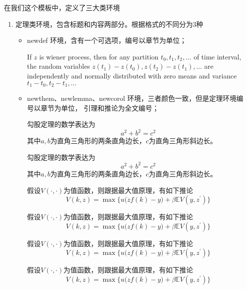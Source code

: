 \documentclass[cyan]{elegantnote}
\begin{document}
在我们这个模板中，定义了三大类环境
\begin{enumerate}
\item 定理类环境，包含标题和内容两部分。根据格式的不同分为3种
\begin{itemize}
\item {\color{main} newdef} 环境，含有一个可选项，编号以章节为单位；

\begin{newdef}
If $z$ is wiener process, then for any partition $t_0,t_1,t_2,\ldots$ of time interval, the 
random variables $z(t_1)-z(t_0),z(t_2)-z(t_1),\ldots$ are independently and normally distributed 
with zero means and variance $t_1-t_0,t_2-t_1,\ldots$
\end{newdef}

\item {\color{main}newthem、newlemma、newcorol} 环境，三者颜色一致，但是定理环境编号以章节为单位，
引理和推论为全文编号；

\begin{newthem}[勾股定理]
勾股定理的数学表达为
\[a^2+b^2=c^2\]
其中$a,b$为直角三角形的两条直角边长，$c$为直角三角形斜边长。
\end{newthem}

\begin{newthem}[勾股定理]
勾股定理的数学表达为
\[a^2+b^2=c^2\]
其中$a,b$为直角三角形的两条直角边长，$c$为直角三角形斜边长。
\end{newthem}

\begin{newlemma}
假设$V(\cdot,\cdot)$为值函数，则跟据最大值原理，有如下推论
\[
V(k,z)=\max\Big\{u\big(zf(k)-y\big)+\beta \mathbb{E}V(y,z^\prime)\Big\}
\]
\end{newlemma}

\begin{newlemma}
假设$V(\cdot,\cdot)$为值函数，则跟据最大值原理，有如下推论
\[
V(k,z)=\max\Big\{u\big(zf(k)-y\big)+\beta \mathbb{E}V(y,z^\prime)\Big\}
\]
\end{newlemma}

\begin{newlemma}
假设$V(\cdot,\cdot)$为值函数，则跟据最大值原理，有如下推论
\[
V(k,z)=\max\Big\{u\big(zf(k)-y\big)+\beta \mathbb{E}V(y,z^\prime)\Big\}
\]
\end{newlemma}

\begin{newcorol}
假设$V(\cdot,\cdot)$为值函数，则跟据最大值原理，有如下推论
\[
V(k,z)=\max\Big\{u\big(zf(k)-y\big)+\beta \mathbb{E}V(y,z^\prime)\Big\}
\]
\end{newcorol}


\end{itemize}
\end{enumerate}
\end{document}
